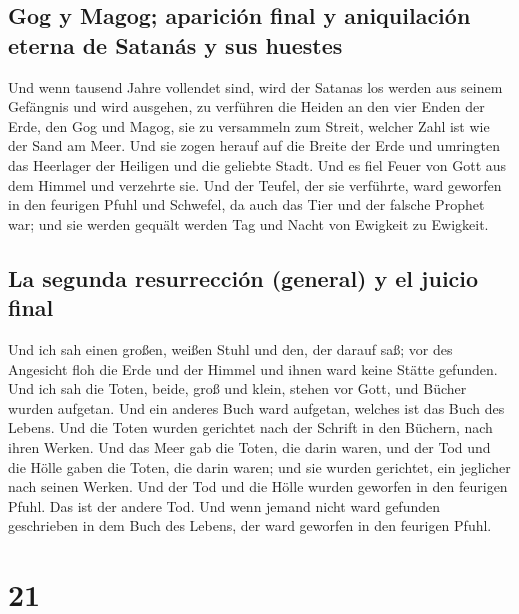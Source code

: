 \hypertarget{gog-y-magog-apariciuxf3n-final-y-aniquilaciuxf3n-eterna-de-satanuxe1s-y-sus-huestes}{%
\subsection{Gog y Magog; aparición final y aniquilación eterna de
Satanás y sus
huestes}\label{gog-y-magog-apariciuxf3n-final-y-aniquilaciuxf3n-eterna-de-satanuxe1s-y-sus-huestes}}

 Und wenn tausend Jahre vollendet sind, wird der Satanas
los werden aus seinem Gefängnis  und wird ausgehen, zu
verführen die Heiden an den vier Enden der Erde, den Gog und Magog, sie
zu versammeln zum Streit, welcher Zahl ist wie der Sand am Meer.
 Und sie zogen herauf auf die Breite der Erde und
umringten das Heerlager der Heiligen und die geliebte Stadt. Und es fiel
Feuer von Gott aus dem Himmel und verzehrte sie.  Und der
Teufel, der sie verführte, ward geworfen in den feurigen Pfuhl und
Schwefel, da auch das Tier und der falsche Prophet war; und sie werden
gequält werden Tag und Nacht von Ewigkeit zu Ewigkeit.

\hypertarget{la-segunda-resurrecciuxf3n-general-y-el-juicio-final}{%
\subsection{La segunda resurrección (general) y el juicio
final}\label{la-segunda-resurrecciuxf3n-general-y-el-juicio-final}}

 Und ich sah einen großen, weißen Stuhl und den, der
darauf saß; vor des Angesicht floh die Erde und der Himmel und ihnen
ward keine Stätte gefunden.  Und ich sah die Toten,
beide, groß und klein, stehen vor Gott, und Bücher wurden aufgetan. Und
ein anderes Buch ward aufgetan, welches ist das Buch des Lebens. Und die
Toten wurden gerichtet nach der Schrift in den Büchern, nach ihren
Werken.  Und das Meer gab die Toten, die darin waren, und
der Tod und die Hölle gaben die Toten, die darin waren; und sie wurden
gerichtet, ein jeglicher nach seinen Werken.  Und der Tod
und die Hölle wurden geworfen in den feurigen Pfuhl. Das ist der andere
Tod.  Und wenn jemand nicht ward gefunden geschrieben in
dem Buch des Lebens, der ward geworfen in den feurigen Pfuhl.

\hypertarget{section-20}{%
\section{21}\label{section-20}}

